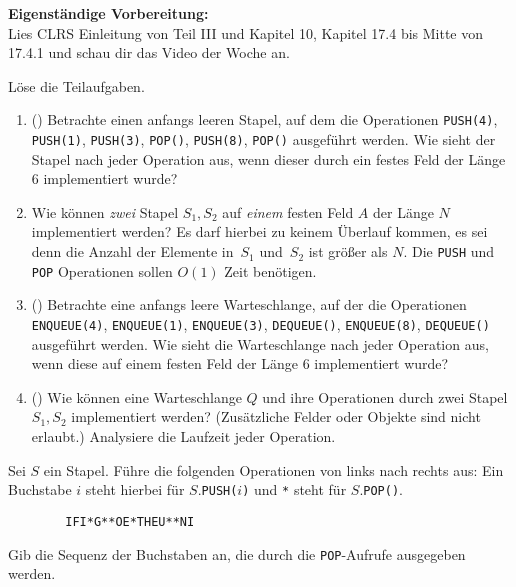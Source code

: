 \documentclass{uebung_cs}
\begin{document}
\textbf{Eigenständige Vorbereitung:}\\
Lies  CLRS Einleitung von Teil III und Kapitel 10, Kapitel 17.4 bis Mitte von 17.4.1 und schau dir das  Video der Woche an.

\begin{aufgabe}
	Löse die Teilaufgaben.
	\begin{enumerate}
		\item (\warmup) Betrachte einen anfangs leeren Stapel, auf dem die Operationen \texttt{PUSH(4)}, \texttt{PUSH(1)}, \texttt{PUSH(3)}, \texttt{POP()}, \texttt{PUSH(8)}, \texttt{POP()} ausgeführt werden. Wie sieht der Stapel nach jeder Operation aus, wenn dieser durch ein festes Feld der Länge 6 implementiert wurde?
		\item Wie können \emph{zwei} Stapel $S_1, S_2$ auf \emph{einem} festen Feld $A$ der Länge $N$ implementiert werden?
		Es darf hierbei zu keinem Überlauf kommen, es sei denn die Anzahl der Elemente in~$S_1$ und~$S_2$ ist größer als $N$.
		Die \texttt{PUSH} und \texttt{POP} Operationen sollen $O(1)$ Zeit benötigen.
		\item (\warmup) Betrachte eine anfangs leere Warteschlange, auf der die Operationen \texttt{ENQUEUE(4)}, \texttt{ENQUEUE(1)}, \texttt{ENQUEUE(3)}, \texttt{DEQUEUE()}, \texttt{ENQUEUE(8)}, \texttt{DEQUEUE()} ausgeführt werden. Wie sieht die Warteschlange nach jeder Operation aus, wenn diese auf einem festen Feld der Länge 6 implementiert wurde?
		\item (\hard) Wie können eine Warteschlange $Q$ und ihre Operationen durch zwei Stapel $S_1, S_2$ implementiert werden? (Zusätzliche Felder oder Objekte sind nicht erlaubt.)
		Analysiere die Laufzeit jeder Operation.
	\end{enumerate}
\end{aufgabe}

\begin{aufgabe}
	Sei $S$ ein Stapel.
	Führe die folgenden Operationen von links nach rechts aus: Ein Buchstabe $i$ steht hierbei für $S.$\texttt{PUSH(}$i$\texttt{)} und \verb|*| steht für $S.$\texttt{POP()}.
	\begin{verbatim}
		IFI*G**OE*THEU**NI
	\end{verbatim}
	Gib die Sequenz der Buchstaben an, die durch die \texttt{POP}-Aufrufe ausgegeben werden.
\end{aufgabe}
\end{document}
